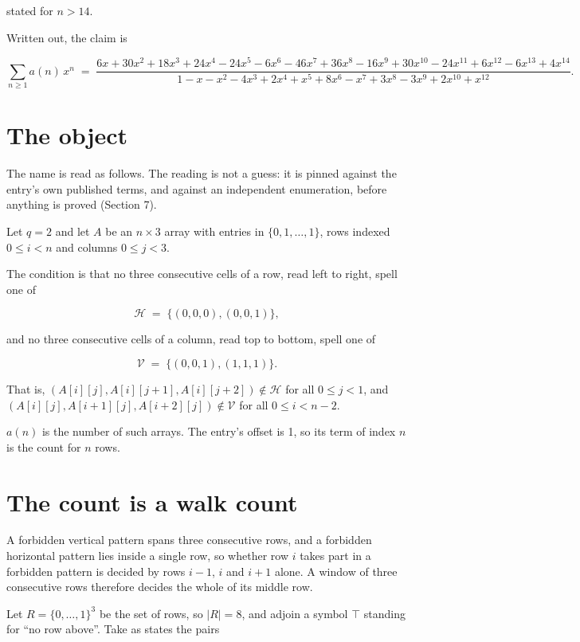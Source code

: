 \documentclass[11pt]{article}
\theoremstyle{definition}
\begin{document}
stated for $n > 14$.

Written out, the claim is

\[\sum_{n \ge 1} a(n)\,x^n \;=\; \frac{6x + 30x^{2} + 18x^{3} + 24x^{4} - 24x^{5} - 6x^{6} - 46x^{7} + 36x^{8} - 16x^{9} + 30x^{10} - 24x^{11} + 6x^{12} - 6x^{13} + 4x^{14}}{1 - x - x^{2} - 4x^{3} + 2x^{4} + x^{5} + 8x^{6} - x^{7} + 3x^{8} - 3x^{9} + 2x^{10} + x^{12}}.\]

\section{The object}

The name is read as follows. The reading is not a guess: it is pinned against the entry's own published terms, and against an independent enumeration, before anything is proved (Section 7).

Let $q = 2$ and let $A$ be an $n \times 3$ array with entries in $\{0,1,\dots,1\}$, rows indexed $0 \le i < n$ and columns $0 \le j < 3$.

The condition is that no three consecutive cells of a row, read left to right, spell one of

\[\mathcal{H} \;=\; \{(0,0,0), (0,0,1)\},\]

and no three consecutive cells of a column, read top to bottom, spell one of

\[\mathcal{V} \;=\; \{(0,0,1), (1,1,1)\}.\]

That is, $(A[i][j],A[i][j{+}1],A[i][j{+}2]) \notin \mathcal{H}$ for all $0 \le j < 1$, and $(A[i][j],A[i{+}1][j],A[i{+}2][j]) \notin \mathcal{V}$ for all $0 \le i < n-2$.

$a(n)$ is the number of such arrays. The entry's offset is 1, so its term of index $n$ is the count for $n$ rows.

\section{The count is a walk count}

A forbidden vertical pattern spans three consecutive rows, and a forbidden horizontal pattern lies inside a single row, so whether row $i$ takes part in a forbidden pattern is decided by rows $i-1$, $i$ and $i+1$ alone. A window of three consecutive rows therefore decides the whole of its middle row.

Let $R = \{0,\dots,1\}^{3}$ be the set of rows, so $|R| = 8$, and adjoin a symbol $\top$ standing for ``no row above''. Take as states the pairs
\end{document}
